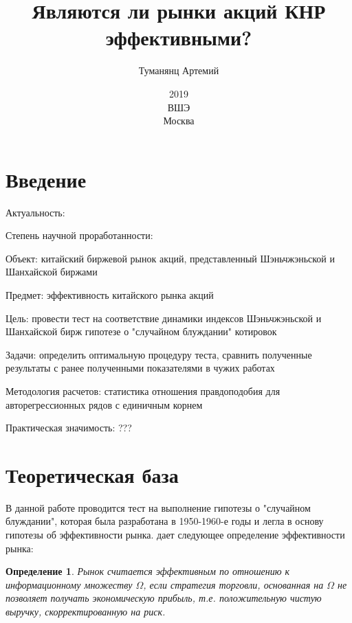 \documentclass[a4paper,12pt]{article}
\title{Являются ли рынки акций КНР эффективными?}
\author{Туманянц Артемий}
\date{2019\\ВШЭ\\Москва}
\newtheorem{definition}{Определение}
\begin{document}


\section{Введение}

Актуальность:

Степень научной проработанности:

Объект: китайский биржевой рынок акций, представленный Шэньчжэньской и Шанхайской биржами

Предмет: эффективность китайского рынка акций

Цель: провести тест на соответствие динамики индексов Шэньчжэньской и Шанхайской бирж гипотезе о "случайном блуждании" котировок

Задачи: определить оптимальную процедуру теста, сравнить полученные результаты с ранее полученными показателями в чужих работах

Методология расчетов: статистика отношения правдоподобия для авторегрессионных рядов с единичным корнем

Практическая значимость: ???
\newpage
\section{Теоретическая база}

В данной работе проводится тест на выполнение гипотезы о "случайном блуждании", которая была разработана в 1950-1960-е годы и легла в основу гипотезы об эффективности рынка. \cite{Jensen1978} дает следующее определение эффективности рынка:

\begin{definition}
  Рынок считается эффективным по отношению к информационному множеству $\Omega$, если стратегия торговли, основанная на $\Omega$ не позволяет получать экономическую прибыль, т.е. положительную чистую выручку, скорректированную на риск.
\end{definition}
\end{document}
